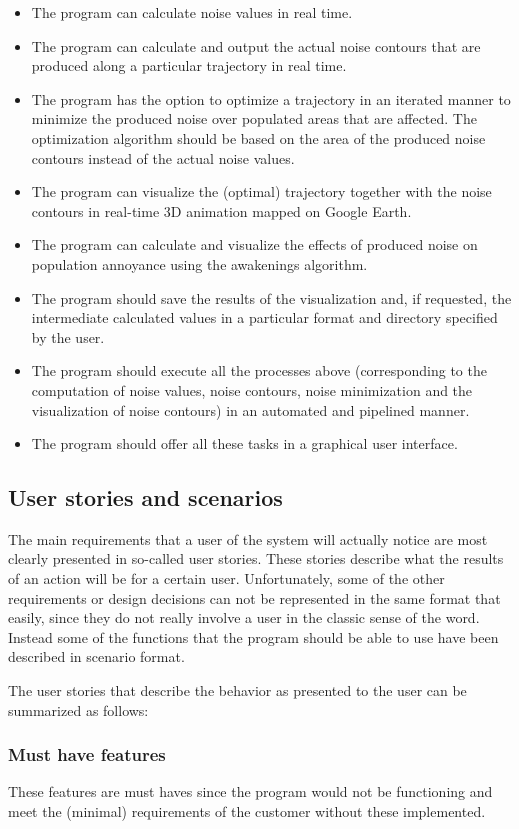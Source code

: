 \begin{itemize}
\item The program can calculate noise values in real time.
\item The program can calculate and output the actual noise contours that are produced along a particular trajectory in real time.
\item The program has the option to optimize a trajectory in an iterated manner to minimize the produced noise over populated areas that are affected. The optimization algorithm should be based on the area of the produced noise contours instead of the actual noise values.
\item The program can visualize the (optimal) trajectory together with the noise contours in real-time 3D animation mapped on Google Earth.
\item The program can calculate and visualize the effects of produced noise on population annoyance using the awakenings algorithm.
\item The program should save the results of the visualization and, if requested, the intermediate calculated values in a particular format and directory specified by the user.
\item The program should execute all the processes above (corresponding to the computation of noise values, noise contours, noise minimization and the visualization of noise contours) in an automated and pipelined manner.
\item The program should offer all these tasks in a graphical user interface.
\end{itemize}

\subsection{User stories and scenarios}
The main requirements that a user of the system will actually notice are most clearly presented in so-called user stories. These stories describe what the results of an action will be for a certain user. Unfortunately, some of the other requirements or design decisions can not be represented in the same format that easily, since they do not really involve a user in the classic sense of the word. Instead some of the functions that the program should be able to use have been described in scenario format.

The user stories that describe the behavior as presented to the user can be summarized as follows:

\subsubsection{Must have features} 
These features are must haves since the program would not be functioning and meet the (minimal) requirements of the customer without these implemented. 

